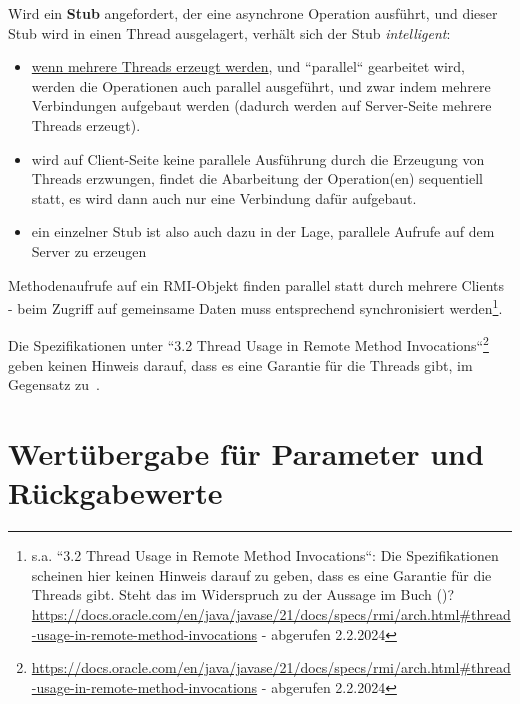 \noindent
Wird ein \textbf{Stub} angefordert, der eine asynchrone Operation ausführt, und dieser Stub wird in einen Thread ausgelagert, verhält sich der Stub \textit{intelligent}:

\begin{itemize}
    \item \ul{wenn mehrere Threads erzeugt werden}, und ``parallel`` gearbeitet wird, werden die Operationen auch parallel ausgeführt, und zwar indem mehrere Verbindungen aufgebaut werden (dadurch werden auf Server-Seite mehrere Threads erzeugt).
    \item wird auf Client-Seite keine parallele Ausführung durch die Erzeugung von Threads erzwungen, findet die Abarbeitung der Operation(en) sequentiell statt, es wird dann auch nur eine Verbindung dafür aufgebaut.
    \item ein einzelner Stub ist also auch dazu in der Lage, parallele Aufrufe auf dem Server zu erzeugen
\end{itemize}

\begin{tcolorbox}[enlarge top by=0.5cm,enlarge bottom by=0.5cm]
    Methodenaufrufe auf ein RMI-Objekt finden parallel statt durch mehrere Clients - beim Zugriff auf gemeinsame Daten muss entsprechend synchronisiert werden\footnote{
        s.a. ``3.2 Thread Usage in Remote Method Invocations``: Die Spezifikationen scheinen hier keinen Hinweis darauf zu geben, dass es eine Garantie für die Threads gibt. Steht das im Widerspruch zu der Aussage im Buch (\cite[330]{Oec22})? \url{https://docs.oracle.com/en/java/javase/21/docs/specs/rmi/arch.html#thread-usage-in-remote-method-invocations} - abgerufen 2.2.2024
    }.
\end{tcolorbox}

\begin{tcolorbox}[colback=red!20,color=white,title=Anmerkung]
    Die Spezifikationen unter ``3.2 Thread Usage in Remote Method Invocations``\footnote{
        \url{https://docs.oracle.com/en/java/javase/21/docs/specs/rmi/arch.html#thread-usage-in-remote-method-invocations} - abgerufen 2.2.2024
    } geben keinen Hinweis darauf, dass es eine Garantie für die Threads gibt, im Gegensatz zu~\cite[330]{Oec22}.
\end{tcolorbox}

\section{Wertübergabe für Parameter und Rückgabewerte}

